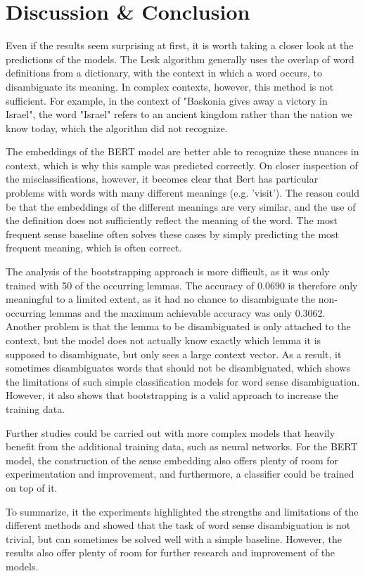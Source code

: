 \documentclass[12pt]{article}
\begin{document}
\section{Discussion \& Conclusion}

Even if the results seem surprising at first, it is worth taking a closer look at the predictions of the models. The Lesk algorithm generally uses the overlap of word definitions from a dictionary, with the context in which a word occurs, to disambiguate its meaning. In complex contexts, however, this method is not sufficient. For example, in the context of "Baskonia gives away a victory in Israel", the word "Israel" refers to an ancient kingdom rather than the nation we know today, which the algorithm did not recognize.

The embeddings of the BERT model are better able to recognize these nuances in context, which is why this sample was predicted correctly. On closer inspection of the misclassifications, however, it becomes clear that Bert has particular problems with words with many different meanings (e.g. 'visit'). The reason could be that the embeddings of the different meanings are very similar, and the use of the definition does not sufficiently reflect the meaning of the word. The most frequent sense baseline often solves these cases by simply predicting the most frequent meaning, which is often correct. 

The analysis of the bootstrapping approach is more difficult, as it was only trained with 50 of the occurring lemmas. The accuracy of 0.0690 is therefore only meaningful to a limited extent, as it had no chance to disambiguate the non-occurring lemmas and the maximum achievable accuracy was only 0.3062. Another problem is that the lemma to be disambiguated is only attached to the context, but the model does not actually know exactly which lemma it is supposed to disambiguate, but only sees a large context vector. As a result, it sometimes disambiguates words that should not be disambiguated, which shows the limitations of such simple classification models for word sense disambiguation. However, it also shows that bootstrapping is a valid approach to increase the training data. 

Further studies could be carried out with more complex models that heavily benefit from the additional training data, such as neural networks. For the BERT model, the construction of the sense embedding also offers plenty of room for experimentation and improvement, and furthermore, a classifier could be trained on top of it. 

To summarize, it the experiments highlighted the strengths and limitations of the different methods and showed that the task of word sense disambiguation is not trivial, but can sometimes be solved well with a simple baseline. However, the results also offer plenty of room for further research and improvement of the models.
\end{document}
